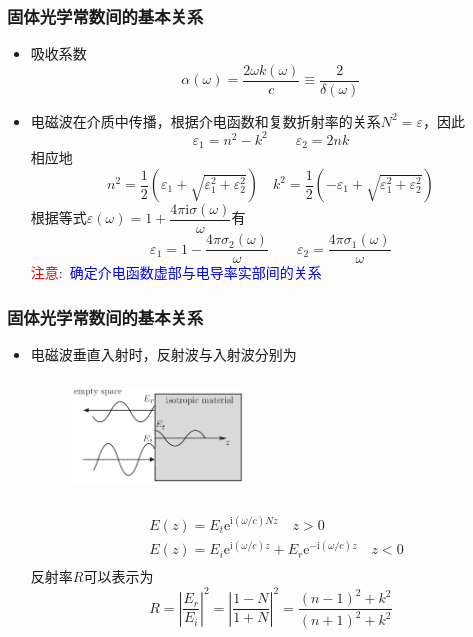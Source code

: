 {\frame
{
	\frametitle{固体光学常数间的基本关系}
	\begin{itemize}
		\item 吸收系数
			\begin{displaymath}
				\alpha(\omega)=\frac{2\omega k(\omega)}c\equiv\frac2{\delta(\omega)}
			\end{displaymath}
		\item 电磁波在介质中传播，根据介电函数和复数折射率的关系$N^2=\varepsilon$，因此
			\begin{displaymath}
				\varepsilon_1=n^2-k^2\qquad\varepsilon_2=2nk
			\end{displaymath}
			相应地
			\begin{displaymath}
				n^2=\frac12(\varepsilon_1+\sqrt{\varepsilon_1^2+\varepsilon_2^2})\quad k^2=\frac12(-\varepsilon_1+\sqrt{\varepsilon_1^2+\varepsilon_2^2})
			\end{displaymath}
			根据等式$\varepsilon(\omega)=1+\dfrac{4\pi\mathrm{i}\sigma(\omega)}{\omega}$有
			\begin{displaymath}
				\varepsilon_1=1-\frac{4\pi\sigma_2(\omega)}{\omega}\qquad\varepsilon_2=\frac{4\pi\sigma_1(\omega)}{\omega} 
			\end{displaymath}
			\textcolor{red}{注意}:~\textcolor{blue}{确定介电函数虚部与电导率实部间的关系}
	\end{itemize}
}

\frame
{
	\frametitle{固体光学常数间的基本关系}
	\begin{itemize}
		\item 电磁波垂直入射时，反射波与入射波分别为
\begin{figure}[h!]
\centering
\vspace*{-0.4in}
\includegraphics[height=1.2in,width=1.8in,viewport=0 0 750 600,clip]{Figures/Optic-reflect.png}
\caption{\fontsize{5.5pt}{4.2pt}}%
\label{Optic-reflect}
\end{figure} 
			\begin{displaymath}
				\begin{aligned}
					&E(z)=E_t\mathrm{e}^{\mathrm{i}(\omega/c)Nz}\quad z>0\\
					&E(z)=E_i\mathrm{e}^{\mathrm{i}(\omega/c)z}+E_r\mathrm{e}^{-\mathrm{i}(\omega/c)z}\quad z<0\\
				\end{aligned}
			\end{displaymath}
			反射率$R$可以表示为
			\begin{displaymath}
				R=\left|\frac{E_r}{E_i}\right|^2=\left|\frac{1-N}{1+N}\right|^2=\frac{(n-1)^2+k^2}{(n+1)^2+k^2}
			\end{displaymath}
	\end{itemize}
}

}
